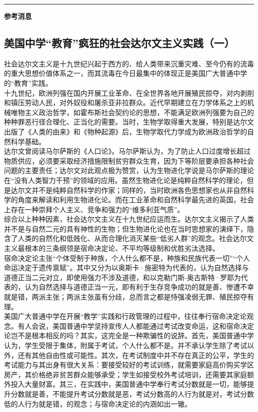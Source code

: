 \documentclass[letterpaper, 12pt]{article}
\begin{document}
\hrule
\vspace{4mm}
\centerline{\huge\textbf{参考消息}}
\begin{multicols}{2}
\section{美国中学“教育”疯狂的社会达尔文主义实践（一）}
社会达尔文主义是十九世纪兴起于西方的、给人类带来沉重灾难、至今仍有的流毒的重大思想价值体系之一，而其流毒在今日最集中的体现正是美国广大普通中学的“教育”实践。\\

十九世纪，欧洲列强在国内开展工业革命、在全世界各地开展殖民掠夺，对内剥削和镇压劳动人民，对外奴役和屠杀亚非拉群众。近代早期建立在力学体系之上的机械唯物主义政治哲学，如霍布斯社会契约论的思想，不能满足欧洲列强要为自己的种种罪恶行径合理化、正当化的需要。当时，生物学取得重大发展，特别是达尔文出版了《人类的由来》和《物种起源》后，生物学取代力学成为欧洲政治哲学的自然科学基础。\\

达尔文曾阅读马尔萨斯的《人口论》。马尔萨斯认为，为了防止人口过度增长超过物质供应，必须要采取经济措施限制贫穷群众生育，因为下等阶层要承担各种社会问题的主要责任；达尔文对此观点极为赞赏，认为生物进化学说是马尔萨斯的理论在“没有人类智力干预”的领域的应用。虽然生物进化论是纯粹自然科学的理论，但是达尔文并不是纯粹自然科学的作家；同样的，当时欧洲各色思想家也从非自然科学的角度来解读和利用生物进化论。而在工业革命和自然科学最先进的英国，社会上存在一种崇拜个人主义、竞争和强力的“维多利亚气质”。\\

综合以上种种因素，社会达尔文主义在十九世纪应运而生。达尔文主义揭示了人类并不是与自然二元的具有神性的生物；但生物进化论也在当时思想家的演绎下，隐含了人类的自然化和低贱化、从而合理化消灭某些“低劣人群”的观念。社会达尔文主义最根本的三条纲领是宿命决定论、不平均等级制和优胜劣汰选择。\\

宿命决定论主张“个体受制于种族，个人什么都不是，种族和民族代表一切”“个人命运决定于遗传禀赋”。其中又分为以奥斯卡·施密特为代表的，认为自然选择与道德正当二元对立，即使用强力不涉及道德，和以克勒门斯-奥古斯特·罗耶为代表的，认为自然选择与道德正当一元，即有利于生存竞争成功的就是善、惨遭不幸就是错，两派主张；两派主张虽有分歧，总而言之都是恃强凌弱无罪、殖民掠夺有理。\\

美国广大普通中学在开展“教学”实践和行政管理的过程中，往往奉行宿命决定论观念。有人会说，美国普通中学坚持宣传人人都能通过考试改变命运，这和宿命决定论岂不是根本相反的吗？其实，这完全是一种欺骗性的说辞。首先，美国普通中学认为，学生受限于集体，附属于考试，个人什么都不是。并不承认学生除了考试以外，还有其他自由性或可能性。其次，在考试制度中并不存在真正的公平，学生的考试能力与其出身有很大关系：要接受较好的考试训练，就需要家庭高价购买学区房产，其价格绝非贫苦群众能够承受；学生如接受校外考试培训，还需要其家庭额外投入大量财富。其三，在实践中，美国普通中学奉行考试分数就是一切，能够提升分数就是善，不能提升考试分数就是恶，考试分数高的人行为就是对，考试分数低的人行为就是错，的观念；与宿命决定论的内涵如出一辙。\\
\end{multicols} 
\end{document}
